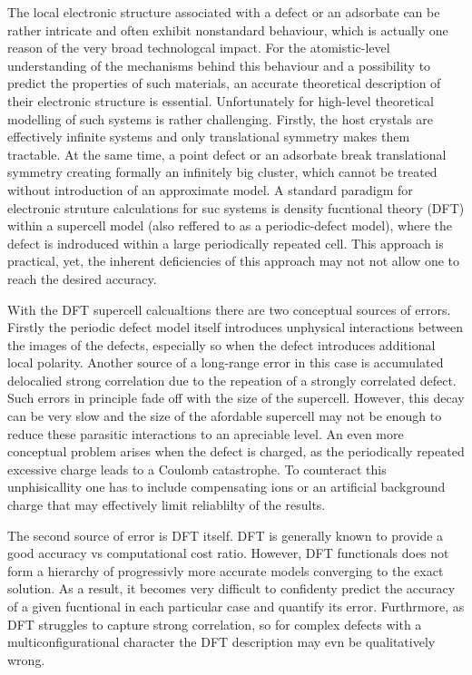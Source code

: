 \documentclass[a4paper,11pt,headings=normal]{scrartcl}
\begin{document}
The local electronic structure associated with a defect or an adsorbate can be rather intricate and often exhibit nonstandard behaviour, which is actually one reason of the very broad technologcal impact. For the atomistic-level understanding of the mechanisms behind this behaviour and a possibility to predict the properties of such materials, an accurate theoretical description of their electronic structure is essential. Unfortunately for high-level theoretical modelling of such systems is rather challenging. Firstly, the host crystals are effectively infinite systems and only translational symmetry makes them tractable. At the same time, a point defect or an adsorbate break translational symmetry creating formally an infinitely big cluster, which cannot be treated without introduction of an approximate model. A standard paradigm for electronic struture calculations for suc systems is density fucntional theory (DFT) within a supercell model (also reffered to as a periodic-defect model), where the defect is indroduced within a large periodically repeated cell. This approach is practical, yet, the inherent deficiencies of this approach may not not allow one to reach the desired accuracy. 

With the DFT supercell calcualtions there are two conceptual sources of errors. Firstly the periodic defect model itself introduces unphysical interactions between the images of the defects, especially so when the defect introduces additional local polarity. Another source of a long-range error in this case is accumulated delocalied strong correlation due to the repeation of a strongly correlated  defect. Such errors in principle fade off with the size of the supercell. However, this decay can be very slow and the size of the afordable supercell may not be enough to reduce these parasitic interactions to an apreciable level. An even more conceptual problem arises when the defect is charged, as the periodically repeated excessive charge leads to a Coulomb catastrophe. To counteract this unphisicallity one has to include compensating ions or an artificial background charge that may effectively limit reliablilty of the results.

The second source of error is DFT itself. DFT is generally known to provide a good accuracy vs computational cost ratio. However, DFT functionals does not form a hierarchy of progressivly more accurate models converging to the exact solution. As a result, it becomes very difficult to confidenty predict the accuracy of a given fucntional in each particular case and quantify its error. Furthrmore, as DFT struggles to capture strong correlation, so for complex defects with a multiconfigurational character the DFT description may evn be qualitatively wrong.
\end{document}
